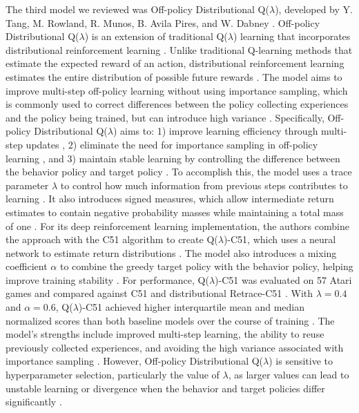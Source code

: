\documentclass[conference]{IEEEtran}
\begin{document}
The third model we reviewed was Off-policy Distributional Q($\lambda$), developed by Y. Tang, M. Rowland, R. Munos, B. Avila Pires, and W. Dabney \cite{b10}. Off-policy Distributional Q($\lambda$) is an extension of traditional Q($\lambda$) learning that incorporates distributional reinforcement learning \cite{b10}. Unlike traditional Q-learning methods that estimate the expected reward of an action, distributional reinforcement learning estimates the entire distribution of possible future rewards \cite{b10}. The model aims to improve multi-step off-policy learning without using importance sampling, which is commonly used to correct differences between the policy collecting experiences and the policy being trained, but can introduce high variance \cite{b10}. Specifically, Off-policy Distributional Q($\lambda$) aims to: 1) improve learning efficiency through multi-step updates \cite{b10}, 2) eliminate the need for importance sampling in off-policy learning \cite{b10}, and 3) maintain stable learning by controlling the difference between the behavior policy and target policy \cite{b10}. To accomplish this, the model uses a trace parameter $\lambda$ to control how much information from previous steps contributes to learning \cite{b10}. It also introduces signed measures, which allow intermediate return estimates to contain negative probability masses while maintaining a total mass of one \cite{b10}. For its deep reinforcement learning implementation, the authors combine the approach with the C51 algorithm to create Q($\lambda$)-C51, which uses a neural network to estimate return distributions \cite{b10}. The model also introduces a mixing coefficient $\alpha$ to combine the greedy target policy with the behavior policy, helping improve training stability \cite{b10}. For performance, Q($\lambda$)-C51 was evaluated on 57 Atari games and compared against C51 and distributional Retrace-C51 \cite{b10}. With $\lambda = 0.4$ and $\alpha = 0.6$, Q($\lambda$)-C51 achieved higher interquartile mean and median normalized scores than both baseline models over the course of training \cite{b10}. The model's strengths include improved multi-step learning, the ability to reuse previously collected experiences, and avoiding the high variance associated with importance sampling \cite{b10}. However, Off-policy Distributional Q($\lambda$) is sensitive to hyperparameter selection, particularly the value of $\lambda$, as larger values can lead to unstable learning or divergence when the behavior and target policies differ significantly \cite{b10}.
\end{document}
